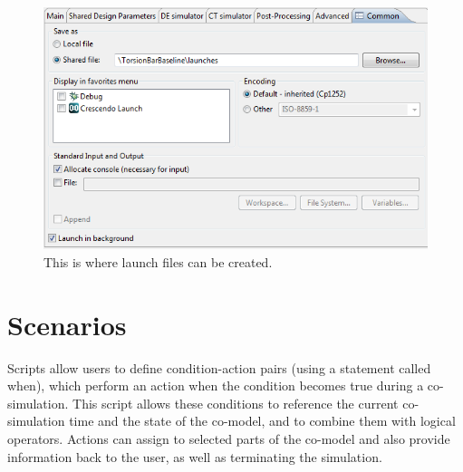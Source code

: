 \documentclass{crescendorepchap}
\begin{document}
\begin{figure}[htbp]
\centering
\includegraphics[width=.6\textwidth]{images/Commontab.png}
\caption{This is where launch files can be created.\label{fig:commontab}}
\end{figure}

\section{Scenarios}



Scripts allow users
  to define condition-action pairs (using a statement called
  when), which perform an action when the condition becomes true during
  a co-simulation. This script allows these conditions to reference the
  current co-simulation time and the state of the co-model, and to
  combine them with logical operators. Actions can assign to selected
  parts of the co-model and also provide information back to the user,
  as well as terminating the simulation.
\end{document}
